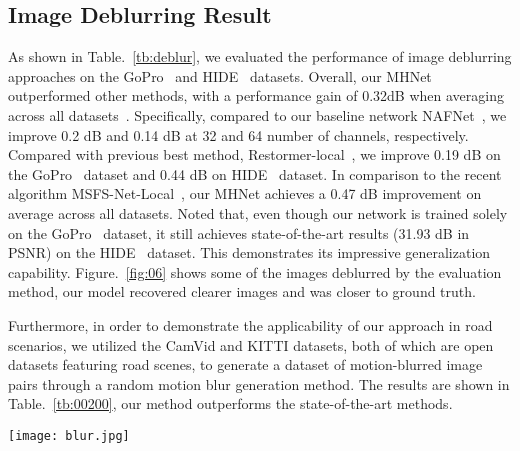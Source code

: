 \documentclass[lettersize,journal]{IEEEtran}
\begin{document}
\subsection{Image Deblurring Result}
As  shown in Table.~\ref{tb:deblur}, we evaluated the performance of image deblurring approaches on the GoPro~\cite{Gopro} and HIDE~\cite{HIDE} datasets. Overall, our MHNet outperformed other methods, with a performance gain of 0.32dB when averaging across all datasets~\cite{Gopro,HIDE}. Specifically, compared to our baseline network NAFNet~\cite{chen2022simple}, we improve 0.2 dB and 0.14 dB at 32  and 64  number of channels, respectively.  Compared with previous best  method, Restormer-local~\cite{Zamir2021Restormer}, we improve 0.19 dB on the GoPro~\cite{Gopro} dataset and 0.44 dB on HIDE~\cite{HIDE} dataset. In comparison to the recent algorithm MSFS-Net-Local~\cite{MSFSnet}, our MHNet achieves a 0.47 dB improvement on average across all datasets. Noted that, even though our network is trained solely on the GoPro~\cite{Gopro} dataset, it still achieves state-of-the-art results (31.93 dB in PSNR) on the HIDE~\cite{HIDE} dataset. This demonstrates its impressive generalization capability. Figure.~\ref{fig:06} shows some of the images deblurred by the evaluation method, our model recovered clearer images and was closer to ground truth.

Furthermore, in order to demonstrate the applicability of our approach in road scenarios, we utilized the CamVid and KITTI datasets, both of which are open datasets featuring road scenes, to generate a dataset of motion-blurred image pairs through a random motion blur generation method. The results are shown in Table.~\ref{tb:00200}, our method outperforms the state-of-the-art methods.

\begin{figure*} \centerline{\texttt{[image: blur.jpg]}}
	\caption{\textbf{Image deblurring} example on the GoPro dataset~\cite{Gopro}. Compared to the state-of-the-art methods, our MHNet
restores sharper and perceptually-faithful images.}
	\label{fig:06}
\end{figure*}
\end{document}
